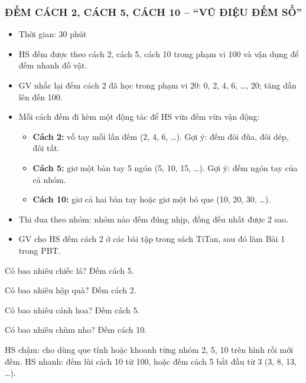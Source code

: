 \documentclass[../main.tex]{subfiles}
\begin{document}
\subsubsection{ĐẾM CÁCH 2, CÁCH 5, CÁCH 10 -- “VŨ ĐIỆU ĐẾM SỐ”}
\begin{hd}
    \begin{itemize}
        \item Thời gian: 30 phút
        \item HS đếm được theo cách 2, cách 5, cách 10 trong phạm vi 100 và vận dụng để đếm nhanh đồ vật.
    \end{itemize}
\end{hd}
\begin{itemize}
    \item GV nhắc lại đếm cách 2 đã học trong phạm vi 20: 0, 2, 4, 6, \dots, 20; tăng dần lên đến 100.
    \item Mỗi cách đếm đi kèm một động tác để HS vừa đếm vừa vận động:
    \begin{itemize}
        \item[--] \textbf{Cách 2:} vỗ tay mỗi lần đếm (2, 4, 6, \dots). Gợi ý: đếm đôi đũa, đôi dép, đôi tất.
        \item[--] \textbf{Cách 5:} giơ một bàn tay 5 ngón (5, 10, 15, \dots). Gợi ý: đếm ngón tay của cả nhóm.
        \item[--] \textbf{Cách 10:} giơ cả hai bàn tay hoặc giơ một bó que (10, 20, 30, \dots).
    \end{itemize}
    \item Thi đua theo nhóm: nhóm nào đếm đúng nhịp, đồng đều nhất được 2 sao.
    \item GV cho HS đếm cách 2 ở các bài tập trong sách TiTan, sau đó làm Bài 1 trong PBT.
\end{itemize}
\begin{listEX}
    \item Có bao nhiêu chiếc lá? Đếm cách 5.
    \item Có bao nhiêu hộp quà? Đếm cách 2.
    \item Có bao nhiêu cánh hoa? Đếm cách 5.
    \item Có bao nhiêu chùm nho? Đếm cách 10.
\end{listEX}
\begin{luuy}
    HS chậm: cho dùng que tính hoặc khoanh từng nhóm 2, 5, 10 trên hình rồi mới đếm. HS nhanh: đếm lùi cách 10 từ 100, hoặc đếm cách 5 bắt đầu từ 3 (3, 8, 13, \dots).
\end{luuy}
\end{document}
